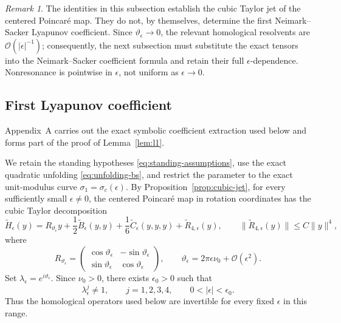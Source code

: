 \documentclass[11pt]{amsart}
\theoremstyle{remark}
\newtheorem{remark}[theorem]{Remark}
\newcommand{\cO}{\mathcal{O}}
\begin{document}
\begin{remark}\label{rem:cubic-jet}
The identities in this subsection establish the cubic Taylor jet of the
centered Poincar\'e map.  They do not, by themselves, determine the first
Neimark--Sacker Lyapunov coefficient.  Since
\(\vartheta_\epsilon\to0\), the relevant homological resolvents are
\(\cO(|\epsilon|^{-1})\); consequently, the next subsection must substitute
the exact tensors into the Neimark--Sacker coefficient formula and retain
their full \(\epsilon\)-dependence.  Nonresonance is pointwise in
\(\epsilon\), not uniform as \(\epsilon\to0\).
\end{remark}

\subsection{First Lyapunov coefficient}

Appendix~A carries out the exact symbolic coefficient extraction used
below and forms part of the proof of Lemma~\ref{lem:l1}.

We retain the standing hypotheses \eqref{eq:standing-assumptions}, use the
exact quadratic unfolding \eqref{eq:unfolding-bs}, and restrict the parameter
to the exact unit-modulus curve \(\sigma_1=\sigma_c(\epsilon)\).  By
Proposition~\ref{prop:cubic-jet}, for every sufficiently small
\(\epsilon\ne0\), the centered Poincar\'e map in rotation coordinates has
the cubic Taylor decomposition
\[
\widetilde H_\epsilon(y)
=R_{\vartheta_\epsilon}y
+\frac12\widetilde B_\epsilon(y,y)
+\frac16\widetilde C_\epsilon(y,y,y)
+\widetilde R_{4,\epsilon}(y),
\qquad
\|\widetilde R_{4,\epsilon}(y)\|\le C\|y\|^4,
\]
where
\[
R_{\vartheta_\epsilon}=
\begin{pmatrix}
\cos\vartheta_\epsilon&-\sin\vartheta_\epsilon\\
\sin\vartheta_\epsilon&\cos\vartheta_\epsilon
\end{pmatrix},
\qquad
\vartheta_\epsilon=2\pi\epsilon\nu_0+\cO(\epsilon^2).
\]
Set \(\lambda_\epsilon=e^{i\vartheta_\epsilon}\).  Since \(\nu_0>0\), there
exists \(\epsilon_0>0\) such that
\begin{equation}\label{eq:nonresonance}
 \lambda_\epsilon^j\ne1,\qquad j=1,2,3,4,\qquad
 0<|\epsilon|<\epsilon_0.
\end{equation}
Thus the homological operators used below are invertible for every fixed
\(\epsilon\) in this range.
\end{document}
